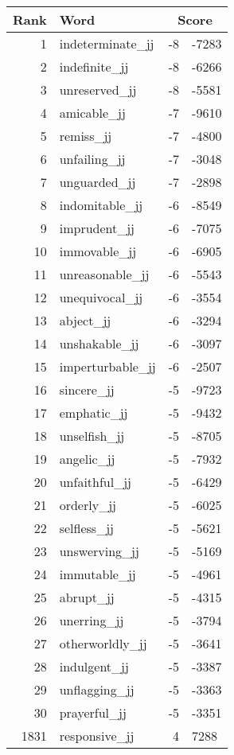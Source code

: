\begin{longtable}[!htbp]{| rlr@{.}l |}
    \hline
    \textbf{Rank} & \textbf{Word} & \multicolumn{2}{c|}{\textbf{Score}} \\
    \hline
    \endhead
    1 & indeterminate\_jj & -8 & -7283 \\
    2 & indefinite\_jj & -8 & -6266 \\
    3 & unreserved\_jj & -8 & -5581 \\
    4 & amicable\_jj & -7 & -9610 \\
    5 & remiss\_jj & -7 & -4800 \\
    6 & unfailing\_jj & -7 & -3048 \\
    7 & unguarded\_jj & -7 & -2898 \\
    8 & indomitable\_jj & -6 & -8549 \\
    9 & imprudent\_jj & -6 & -7075 \\
    10 & immovable\_jj & -6 & -6905 \\
    11 & unreasonable\_jj & -6 & -5543 \\
    12 & unequivocal\_jj & -6 & -3554 \\
    13 & abject\_jj & -6 & -3294 \\
    14 & unshakable\_jj & -6 & -3097 \\
    15 & imperturbable\_jj & -6 & -2507 \\
    16 & sincere\_jj & -5 & -9723 \\
    17 & emphatic\_jj & -5 & -9432 \\
    18 & unselfish\_jj & -5 & -8705 \\
    19 & angelic\_jj & -5 & -7932 \\
    20 & unfaithful\_jj & -5 & -6429 \\
    21 & orderly\_jj & -5 & -6025 \\
    22 & selfless\_jj & -5 & -5621 \\
    23 & unswerving\_jj & -5 & -5169 \\
    24 & immutable\_jj & -5 & -4961 \\
    25 & abrupt\_jj & -5 & -4315 \\
    26 & unerring\_jj & -5 & -3794 \\
    27 & otherworldly\_jj & -5 & -3641 \\
    28 & indulgent\_jj & -5 & -3387 \\
    29 & unflagging\_jj & -5 & -3363 \\
    30 & prayerful\_jj & -5 & -3351 \\
    1831 & responsive\_jj & 4 & 7288 \\

\end{longtable}
